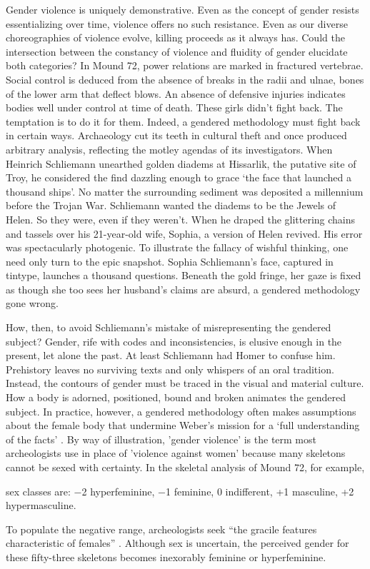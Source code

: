 Gender violence is uniquely demonstrative. Even as the concept of gender resists essentializing over time, violence offers no such resistance. Even as our diverse choreographies of violence evolve, killing proceeds as it always has. Could the intersection between the constancy of violence and fluidity of gender elucidate both categories? In Mound 72, power relations are marked in fractured vertebrae. Social control is deduced from the absence of breaks in the radii and ulnae, bones of the lower arm that deflect blows. An absence of defensive injuries indicates bodies well under control at time of death. These girls didn't fight back. The temptation is to do it for them. Indeed, a gendered methodology must fight back in certain ways. Archaeology cut its teeth in cultural theft and once produced arbitrary analysis, reflecting the motley agendas of its investigators. When Heinrich Schliemann unearthed golden diadems at Hissarlik, the putative site of Troy, he considered the find dazzling enough to grace \enquote*{the face that launched a thousand ships}. 
No matter the surrounding sediment was deposited a millennium before the Trojan War. Schliemann wanted the diadems to be the Jewels of Helen. So they were, even if they weren't. When he draped the glittering chains and tassels over his 21-year-old wife, Sophia, a version of Helen revived. His error was spectacularly photogenic. To illustrate the fallacy of wishful thinking, one need only turn to the epic snapshot. Sophia Schliemann’s face, captured in tintype, launches a thousand questions. Beneath the gold fringe, her gaze is fixed as though she too sees her husband's claims are absurd, a gendered methodology gone wrong. 


How, then, to avoid Schliemann's mistake of misrepresenting the gendered subject? Gender, rife with codes and inconsistencies, is elusive enough in the present, let alone the past. At least Schliemann had Homer to confuse him. Prehistory leaves no surviving texts and only whispers of an oral tradition. Instead, the contours of gender must be traced in the visual and material culture. How a body is adorned, positioned, bound and broken animates the gendered subject. In practice, however, a gendered methodology often makes assumptions about the female body that undermine Weber's mission for a \enquote*{full understanding of the facts} \parencite[146]{weber1946}. By way of illustration, 'gender violence' is the term most archeologists use in place of 'violence against women' because many skeletons cannot be sexed with certainty. In the skeletal analysis of Mound 72, for example, \begin{IJSRAquote}{\cite[63]{fowler1999}}sex classes are: \num{-2} hyperfeminine, \num{-1} feminine, \num{0} indifferent, +1 masculine, +2 hypermasculine.\end{IJSRAquote} To populate the negative range, archeologists seek \enquote{the gracile features characteristic of females} \parencite[54]{fowler1999}. Although sex is uncertain, the perceived gender for these fifty-three skeletons becomes inexorably feminine or hyperfeminine. 

